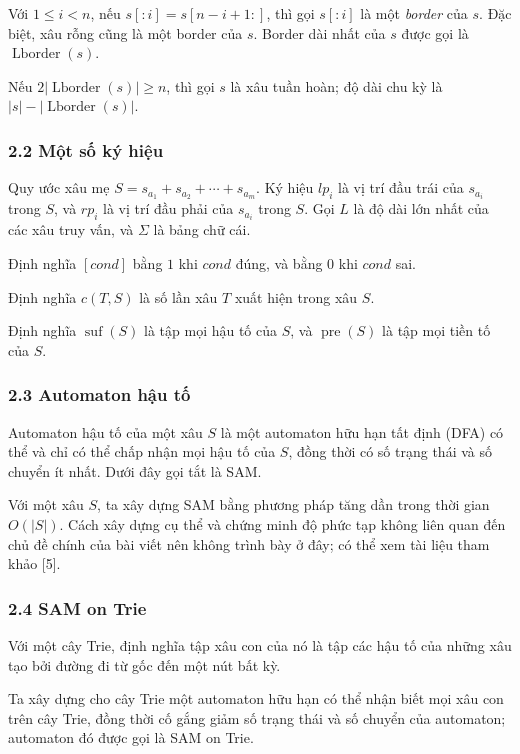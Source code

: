 \documentclass[11pt]{article}
\begin{document}
Với \(1\le i<n\), nếu \(s[:i]=s[n-i+1:]\), thì gọi \(s[:i]\) là một
\emph{border} của \(s\). Đặc biệt, xâu rỗng cũng là một border của \(s\).
Border dài nhất của \(s\) được gọi là \(\operatorname{Lborder}(s)\).

Nếu \(2|\operatorname{Lborder}(s)|\ge n\), thì gọi \(s\) là xâu tuần hoàn; độ
dài chu kỳ là \(|s|-|\operatorname{Lborder}(s)|\).

\subsubsection*{2.2 Một số ký hiệu}

Quy ước xâu mẹ \(S=s_{a_1}+s_{a_2}+\cdots+s_{a_m}\). Ký hiệu \(lp_i\) là vị trí
đầu trái của \(s_{a_i}\) trong \(S\), và \(rp_i\) là vị trí đầu phải của
\(s_{a_i}\) trong \(S\). Gọi \(L\) là độ dài lớn nhất của các xâu truy vấn, và
\(\Sigma\) là bảng chữ cái.

Định nghĩa \([cond]\) bằng \(1\) khi \(cond\) đúng, và bằng \(0\) khi \(cond\)
sai.

Định nghĩa \(c(T,S)\) là số lần xâu \(T\) xuất hiện trong xâu \(S\).

Định nghĩa \(\operatorname{suf}(S)\) là tập mọi hậu tố của \(S\), và
\(\operatorname{pre}(S)\) là tập mọi tiền tố của \(S\).

\subsubsection*{2.3 Automaton hậu tố}

Automaton hậu tố của một xâu \(S\) là một automaton hữu hạn tất định (DFA) có
thể và chỉ có thể chấp nhận mọi hậu tố của \(S\), đồng thời có số trạng thái và
số chuyển ít nhất. Dưới đây gọi tắt là SAM.

Với một xâu \(S\), ta xây dựng SAM bằng phương pháp tăng dần trong thời gian
\(O(|S|)\). Cách xây dựng cụ thể và chứng minh độ phức tạp không liên quan đến
chủ đề chính của bài viết nên không trình bày ở đây; có thể xem tài liệu tham
khảo [5].

\subsubsection*{2.4 SAM on Trie}

Với một cây Trie, định nghĩa tập xâu con của nó là tập các hậu tố của những xâu
tạo bởi đường đi từ gốc đến một nút bất kỳ.

Ta xây dựng cho cây Trie một automaton hữu hạn có thể nhận biết mọi xâu con
trên cây Trie, đồng thời cố gắng giảm số trạng thái và số chuyển của automaton;
automaton đó được gọi là SAM on Trie.
\end{document}

